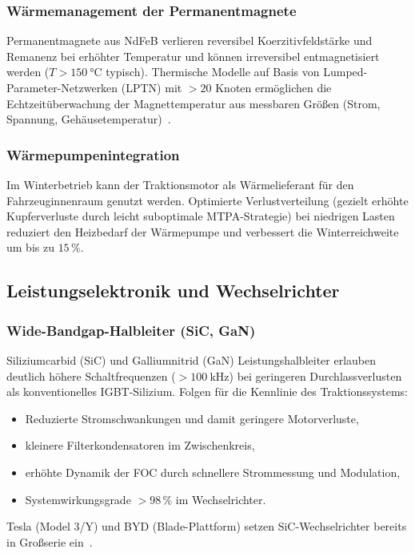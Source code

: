 ﻿\documentclass[a4paper,12pt]{article}
\theoremstyle{definition}
\begin{document}
\subsubsection{Wärmemanagement der Permanentmagnete}

Permanentmagnete aus NdFeB verlieren reversibel Koerzitivfeldstärke und
Remanenz bei erhöhter Temperatur und können irreversibel entmagnetisiert werden
($T > \SI{150}{\degreeCelsius}$ typisch). Thermische Modelle auf Basis
von Lumped-Parameter-Netzwerken (LPTN) mit $> 20$ Knoten ermöglichen die
Echtzeitüberwachung der Magnettemperatur aus messbaren Größen (Strom,
Spannung, Gehäusetemperatur)~\cite{nategh2017thermal}.

\subsubsection{Wärmepumpenintegration}

Im Winterbetrieb kann der Traktionsmotor als Wärmelieferant für den
Fahrzeuginnenraum genutzt werden. Optimierte Verlustverteilung (gezielt erhöhte
Kupferverluste durch leicht suboptimale MTPA-Strategie) bei niedrigen Lasten
reduziert den Heizbedarf der Wärmepumpe und verbessert die Winterreichweite
um bis zu $15\,\%$.

\subsection{Leistungselektronik und Wechselrichter}

\subsubsection{Wide-Bandgap-Halbleiter (SiC, GaN)}

Siliziumcarbid (SiC) und Galliumnitrid (GaN) Leistungshalbleiter erlauben
deutlich höhere Schaltfrequenzen ($>\SI{100}{\kilo\hertz}$) bei geringeren
Durchlassverlusten als konventionelles IGBT-Silizium. Folgen für die
Kennlinie des Traktionssystems:
\begin{itemize}
    \item Reduzierte Stromschwankungen und damit geringere Motorverluste,
    \item kleinere Filterkondensatoren im Zwischenkreis,
    \item erhöhte Dynamik der FOC durch schnellere Strommessung und
          Modulation,
    \item Systemwirkungsgrade $> 98\,\%$ im Wechselrichter.
\end{itemize}
Tesla (Model 3/Y) und BYD (Blade-Plattform) setzen SiC-Wechselrichter bereits
in Großserie ein~\cite{wang2020sic}.
\end{document}
